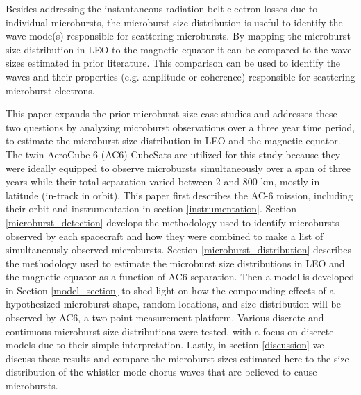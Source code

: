 \documentclass[draft]{agujournal2019}
\begin{document}
Besides addressing the instantaneous radiation belt electron losses due to individual microbursts, the microburst size distribution is useful to identify the wave mode(s) responsible for scattering microbursts. By mapping the microburst size distribution in LEO to the magnetic equator it can be compared to the wave sizes estimated in prior literature. This comparison can be used to identify the waves and their properties (e.g. amplitude or coherence) responsible for scattering microburst electrons.

This paper expands the prior microburst size case studies and addresses these two questions by analyzing microburst observations over a three year time period, to estimate the microburst size distribution in LEO and the magnetic equator. The twin AeroCube-6 (AC6) CubeSats are utilized for this study because they were ideally equipped to observe microbursts simultaneously over a span of three years while their total separation varied between 2 and 800 km, mostly in latitude (in-track in orbit). This paper first describes the AC-6 mission, including their orbit and instrumentation in section \ref{instrumentation}. Section \ref{microburst_detection} develops the methodology used to identify microbursts observed by each spacecraft and how they were combined to make a list of simultaneously observed microbursts. Section \ref{microburst_distribution} describes the methodology used to estimate the microburst size distributions in LEO and the magnetic equator as a function of AC6 separation. Then a model is developed in Section \ref{model_section} to shed light on how the compounding effects of a hypothesized microburst shape, random locations, and size distribution will be observed by AC6, a two-point measurement platform. Various discrete and continuous microburst size distributions were tested, with a focus on discrete models due to their simple interpretation. Lastly, in section \ref{discussion} we discuss these results and compare the microburst sizes estimated here to the size distribution of the whistler-mode chorus waves that are believed to cause microbursts. 
\end{document}
